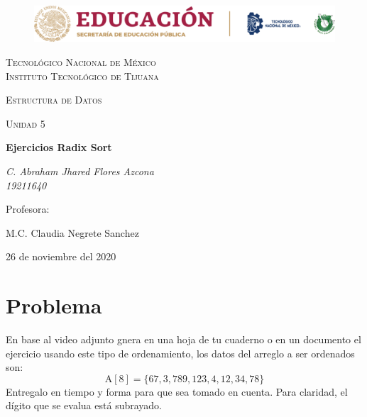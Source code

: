 \documentclass[letterpaper, 12pt]{article}
\begin{document}
    
    \begin{titlepage}
        \begin{figure}[ht]
            \centering
            \includegraphics[width=15cm]{logosITT.png}
        \end{figure}
        \centering
        {\scshape\LARGE Tecnológico Nacional de México\\Instituto Tecnológico de Tijuana\par}
        \vspace{1cm}
        {\scshape\Large Estructura de Datos\par}
        \vspace{1cm}
        {\scshape\Large Unidad 5\par}
        \vspace{1.5cm}
        {\huge\bfseries Ejercicios Radix Sort\par}
        \vspace{2cm}
        {\Large\itshape C. Abraham Jhared Flores Azcona\\19211640\par}
        \vfill
        Profesora: \par
        M.C. Claudia Negrete Sanchez
        
        \vfill

        {\large 26 de noviembre del 2020}
    \end{titlepage}

    \newpage
    \thispagestyle{fancy}
    \setcounter{page}{1}
    \section{Problema}
    En base al video adjunto gnera en una hoja de tu cuaderno o en un documento el ejercicio usando este tipo de ordenamiento, los datos del arreglo a ser ordenados son:
    \[\text{A}[8]=\{67,3,789,123,4,12,34,78\}\]
    Entregalo en tiempo y forma para que sea tomado en cuenta. Para claridad, el dígito que se evalua está subrayado.
\end{document}

